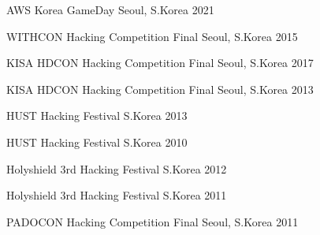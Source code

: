 

\begin{cvhonours}

	{AWS Korea GameDay} %
	{Seoul, S.Korea} %
	{2021} %

	{WITHCON Hacking Competition Final} %
	{Seoul, S.Korea} %
	{2015} %

	{KISA HDCON Hacking Competition Final} %
	{Seoul, S.Korea} %
	{2017} %

	{KISA HDCON Hacking Competition Final} %
	{Seoul, S.Korea} %
	{2013} %

	{HUST Hacking Festival} %
	{S.Korea} %
	{2013} %

	{HUST Hacking Festival} %
	{S.Korea} %
	{2010} %

	{Holyshield 3rd Hacking Festival} %
	{S.Korea} %
	{2012} %

	{Holyshield 3rd Hacking Festival} %
	{S.Korea} %
	{2011} %

	{PADOCON Hacking Competition Final} %
	{Seoul, S.Korea} %
	{2011} %

\end{cvhonours}

